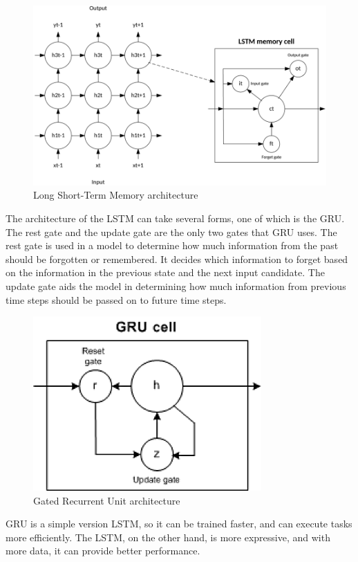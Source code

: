 \begin{figure}[htbp]
    \centering
    \includegraphics[width=0.75\linewidth]{Chapters/Figures/lstm.png}
    \caption{Long Short-Term Memory architecture~\cite{Madhavan2021DeepDeveloper}}
    \label{fig:lstm}
\end{figure}

The architecture of the \gls{LSTM} can take several forms, one of which is the \gls{GRU}. The rest gate and the update gate are the only two gates that \gls{GRU} uses. The rest gate is used in a model to determine how much information from the past should be forgotten or remembered. It decides which information to forget based on the information in the previous state and the next input candidate. The update gate aids the model in determining how much information from previous time steps should be passed on to future time steps.

\begin{figure}[htbp]
    \centering
    \includegraphics[width=0.5\linewidth]{Chapters/Figures/gru.png}
    \caption{Gated Recurrent Unit architecture~\cite{Madhavan2021DeepDeveloper}}
    \label{fig:gru}
\end{figure}

\gls{GRU} is a simple version \gls{LSTM}, so it can be trained faster, and can execute tasks more efficiently. The \gls{LSTM}, on the other hand, is more expressive, and with more data, it can provide better performance.

